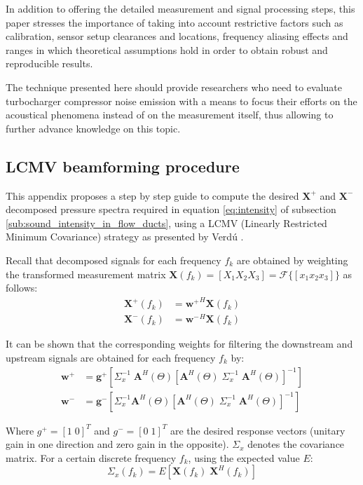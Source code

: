 In addition to offering the detailed measurement and signal processing steps, this paper stresses the importance of taking into account restrictive factors such as calibration, sensor setup clearances and locations, frequency aliasing effects and ranges in which theoretical assumptions hold in order to obtain robust and reproducible results.

The technique presented here should provide researchers who need to evaluate turbocharger compressor noise emission with a means to focus their efforts on the acoustical phenomena instead of on the measurement itself, thus allowing to further advance knowledge on this topic.

\subsection{LCMV beamforming procedure}
\label{ann:beamformer}

This appendix proposes a step by step guide to compute the desired $\mathbf X^+$ and $\mathbf X^-$ decomposed pressure spectra required in equation \ref{eq:intensity} of subsection \ref{sub:sound_intensity_in_flow_ducts}, using a LCMV (Linearly Restricted Minimum Covariance) strategy as presented by Verdú \cite{verdu2003contribucion}.

Recall that decomposed signals for each frequency $f_k$ are obtained by weighting the transformed measurement matrix $\mathbf X(f_k)=[X_1 X_2 X_3]=\mathcal F\{[x_1 x_2 x_3]\}$ as follows:
\begin{align}
    \mathbf X^+(f_k)&=\mathbf {w^+}^H\mathbf X(f_k)\\
    \mathbf X^-(f_k)&=\mathbf {w^-}^H\mathbf X(f_k)
\end{align}

It can be shown that the corresponding weights for filtering the downstream and upstream signals are obtained for each frequency $f_k$ by:
\begin{align}
    \mathbf w^+ &=\mathbf g^+\left[ \Sigma^{-1}_x\; \mathbf A^H(\Theta)\left[\mathbf A^H(\Theta)\; \Sigma^{-1}_x\; \mathbf A^H(\Theta)\right]^{-1}\right]\\
    \mathbf w^- &=\mathbf g^-\left[ \Sigma^{-1}_x \mathbf A^H(\Theta)\left[\mathbf A^H(\Theta)\; \Sigma^{-1}_x\; \mathbf A^H(\Theta)\right]^{-1}\right]
\end{align}

Where $g^+=[1\;0]^T$ and $g^-=[0\;1]^T$ are the desired response vectors (unitary gain in one direction and zero gain in the opposite). $\Sigma_x$ denotes the covariance matrix. For a certain discrete frequency $f_k$, using the expected value $E$:
\begin{equation}
  \Sigma_x(f_k)=E[\mathbf X(f_k)\;\mathbf X^H(f_k)]
\end{equation}

